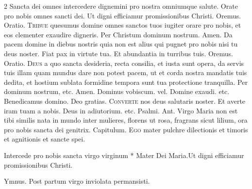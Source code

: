 \begin{multicols*}{2}
 Sancta dei omnes intercedere dignemini pro nostra omniumque salute. \V Orate pro nobis omnes sancti dei. \R Ut digni efficiamur promissionibus Christi. Oremus. {\color{Red} Oratio.}
\lettrine[lines=2]{\zallmancaps \color{Red} T}{ribue} quesumus domine omnes sanctos tuos iugiter orare pro nobis, et eos clementer exaudire digneris. Per Christum dominum nostrum. Amen.
 Da pacem domine in diebus nostris quia non est alius qui pugnet pro nobis nisi tu deus noster. \V Fiat pax in virtute tua. \R Et abundantia in turribus tuis. Oremus. {\color{Red} Oratio.}
\lettrine[lines=2]{\zallmancaps \color{Blue} D}{eus} a quo sancta desideria, recta consilia, et iusta sunt opera, da servis tuis illam quam mundus dare non potest pacem, ut et corda nostra mandatis tuis dedita, et hostium sublata formidine tempora sunt tua protectione tranquilla. Per dominum nostrum, etc. Amen. Dominus vobiscum. {\color{Red} vel.} Domine exaudi. etc. Benedicamus domino. Deo gratias.
{\color{Red} }
\lettrine[lines=2]{\zallmancaps \color{Red} C}{onverte} nos deus salutaris noster. Et averte iram tuam a nobis. Deus in adiutorium. etc. {\color{Red} Psalmi.}
{\color{Red} Ant.} Virgo Maria non est tibi similis nata in mundo inter mulieres, florens ut rosa, fragrans sicut lilium, ora pro nobis sancta dei genitrix. {\color{Red} Capitulum.}
\lettrine[lines=2]{\zallmancaps \color{Blue} E}{go} mater pulchre dilectionis et timoris et agnitionis et sancte spei.
\begin{responsory-breve}
{Intercede pro nobis sancta virgo virginum * Mater Dei Maria.}{Ut digni efficiamur promissionibus Christi.}
\end{responsory-breve}%
{\color{Red} Ymnus.}
\newline \V Post partum virgo inviolata permansisti.

\end{multicols*}
